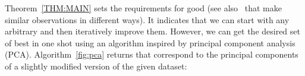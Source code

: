Theorem~\ref{THM:MAIN} sets the requirements for good \views (see
also~\cite{tveten2019principal, tveten2019tailored,
DBLP:journals/tnn/KunchevaF14} that make similar observations in different
ways). It indicates that we can start with any arbitrary \views and then
iteratively improve them. However, we can get the desired set of best \views in
one shot using an algorithm inspired by principal component analysis (PCA).
 Algorithm~\ref{fig:pca}  returns \views that
correspond to the principal components of a
slightly modified version of the given dataset: %

\smallskip

